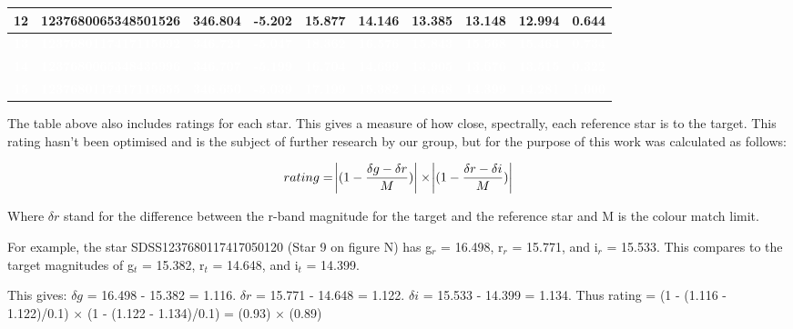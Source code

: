 \documentclass[]{elsarticle} %
\begin{document}
\begin{table}[H]
\begin{tabular}{l|l|r|r|r|r|r|r|r|r}
\hline
12 & 1237680065348501526 & 346.804 & -5.202 & 15.877 & 14.146 & 13.385 & 13.148 & 12.994 & 0.644\\
\hline
\rowcolor[HTML]{D7261E}  \textcolor{white}{\textbf{13}} & \textcolor{white}{\textbf{1237680117417115692}} & \textcolor{white}{\textbf{346.724}} & \textcolor{white}{\textbf{-5.047}} & \textcolor{white}{\textbf{18.362}} & \textcolor{white}{\textbf{16.576}} & \textcolor{white}{\textbf{15.843}} & \textcolor{white}{\textbf{15.568}} & \textcolor{white}{\textbf{15.464}} & \textcolor{white}{\textbf{0.734}}\\
\hline
\rowcolor[HTML]{D7261E}  \textcolor{white}{\textbf{14}} & \textcolor{white}{\textbf{1237680065348435996}} & \textcolor{white}{\textbf{346.707}} & \textcolor{white}{\textbf{-5.199}} & \textcolor{white}{\textbf{16.704}} & \textcolor{white}{\textbf{14.699}} & \textcolor{white}{\textbf{13.905}} & \textcolor{white}{\textbf{13.676}} & \textcolor{white}{\textbf{13.515}} & \textcolor{white}{\textbf{0.322}}\\
\hline
\rowcolor[HTML]{D7261E}  \textcolor{white}{\textbf{15}} & \textcolor{white}{\textbf{1237680117417115655}} & \textcolor{white}{\textbf{346.650}} & \textcolor{white}{\textbf{-5.039}} & \textcolor{white}{\textbf{17.199}} & \textcolor{white}{\textbf{15.382}} & \textcolor{white}{\textbf{14.648}} & \textcolor{white}{\textbf{14.399}} & \textcolor{white}{\textbf{14.281}} & \textcolor{white}{\textbf{1.000}}\\
\hline
\end{tabular}
\end{table}

The table above also includes ratings for each star. This gives a
measure of how close, spectrally, each reference star is to the target.
This rating hasn't been optimised and is the subject of further research
by our group, but for the purpose of this work was calculated as
follows:

\[rating = \abs{(1-\frac{\delta g - \delta r}{M})} \times \abs{(1-\frac{\delta r - \delta i}{M})}\]

Where \(\delta r\) stand for the difference between the r-band magnitude
for the target and the reference star and M is the colour match limit.

For example, the star SDSS1237680117417050120 (Star 9 on figure N) has
g\(_r\) = 16.498, r\(_r\) = 15.771, and i\(_r\) = 15.533. This compares
to the target magnitudes of g\(_t\) = 15.382, r\(_t\) = 14.648, and
i\(_t\) = 14.399.

This gives: \(\delta g\) = 16.498 - 15.382 = 1.116. \(\delta r\) =
15.771 - 14.648 = 1.122. \(\delta i\) = 15.533 - 14.399 = 1.134. Thus
rating = (1 - (\textbar{}1.116 - 1.122)/0.1\textbar{}) \(\times\) (1 -
(\textbar{}1.122 - 1.134)/0.1\textbar{}) = (0.93) \(\times\) (0.89)
\end{document}
